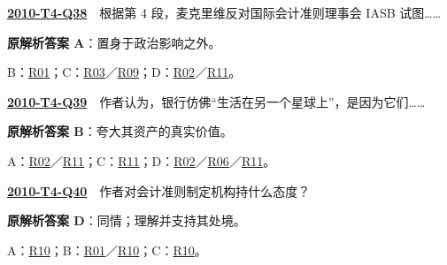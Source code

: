 \documentclass[11pt,a4paper]{article}
\begin{document}
\label{idx-2010-T4-Q38}\noindent\textbf{\href{https://zj139.github.io/math-notes/english/cc5bcd527d8ad5bbc083e9f6/\#q38}{2010-T4-Q38}}　根据第 4 段，麦克里维反对国际会计准则理事会 IASB 试图……\par\nopagebreak
\noindent\textbf{原解析答案 A}：置身于政治影响之外。\par\nopagebreak
\noindent B：\hyperref[cat-R01]{R01}；C：\hyperref[cat-R03]{R03}／\hyperref[cat-R09]{R09}；D：\hyperref[cat-R02]{R02}／\hyperref[cat-R11]{R11}。\par\smallskip
{}\label{idx-2010-T4-Q39}\noindent\textbf{\href{https://zj139.github.io/math-notes/english/cc5bcd527d8ad5bbc083e9f6/\#q39}{2010-T4-Q39}}　作者认为，银行仿佛“生活在另一个星球上”，是因为它们……\par\nopagebreak
\noindent\textbf{原解析答案 B}：夸大其资产的真实价值。\par\nopagebreak
\noindent A：\hyperref[cat-R02]{R02}／\hyperref[cat-R11]{R11}；C：\hyperref[cat-R11]{R11}；D：\hyperref[cat-R02]{R02}／\hyperref[cat-R06]{R06}／\hyperref[cat-R11]{R11}。\par\smallskip
{}\label{idx-2010-T4-Q40}\noindent\textbf{\href{https://zj139.github.io/math-notes/english/cc5bcd527d8ad5bbc083e9f6/\#q40}{2010-T4-Q40}}　作者对会计准则制定机构持什么态度？\par\nopagebreak
\noindent\textbf{原解析答案 D}：同情；理解并支持其处境。\par\nopagebreak
\noindent A：\hyperref[cat-R10]{R10}；B：\hyperref[cat-R01]{R01}／\hyperref[cat-R10]{R10}；C：\hyperref[cat-R10]{R10}。\par\smallskip
\clearpage
\end{document}
